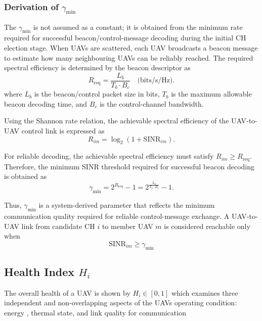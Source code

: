 \documentclass[journal]{IEEEtran}
\begin{document}
\subsubsection{Derivation of $\gamma_{\min}$}

The $\gamma_{\min}$ is not assumed as a constant; it is
obtained from the minimum rate required for successful
beacon/control-message decoding during the initial CH
election stage. When UAVs are scattered, each UAV broadcasts
a beacon message to estimate how many neighbouring UAVs
can be reliably reached. The required spectral efficiency is
determined by the beacon descriptor as
\begin{equation}
\label{eq:Rreq}
R_{\mathrm{req}}
=
\frac{L_b}{T_b\cdot B_c}
\quad \text{(bits/s/Hz)}.
\end{equation}
where $L_b$ is the beacon/control packet size in bits, $T_b$
is the maximum allowable beacon decoding time, and $B_c$
is the control-channel bandwidth.

Using the Shannon rate relation, the achievable spectral
efficiency of the UAV-to-UAV control link is expressed as
\begin{equation}
\label{eq:Rim}
R_{im}
=
\log_2\left(1+\mathrm{SINR}_{im}\right).
\end{equation}

For reliable decoding, the achievable spectral efficiency must
satisfy $R_{im}\geq R_{\mathrm{req}}$. Therefore, the minimum
SINR threshold required for successful beacon decoding is
obtained as
\begin{equation}
\label{eq:gamma_min}
\gamma_{\min}
=
2^{R_{\mathrm{req}}}-1
=
2^{\frac{L_b}{T_b\cdot B_c}}-1.
\end{equation}

Thus, $\gamma_{\min}$ is a system-derived parameter that
reflects the minimum communication quality required for
reliable control-message exchange. A UAV-to-UAV link from
candidate CH $i$ to member UAV $m$ is considered reachable
only when
\begin{equation}
\label{eq:reachable}
\mathrm{SINR}_{im}\geq\gamma_{\min}
\end{equation}



\subsection{ Health Index $H_{i}$}\label{sec:health}

The overall health of a UAV is shown by  $H_{i}\in[0,1]$ 
 which examines three independent and non-overlapping aspects of the UAVs operating condition: energy , thermal state, and link quality for communication
\end{document}
